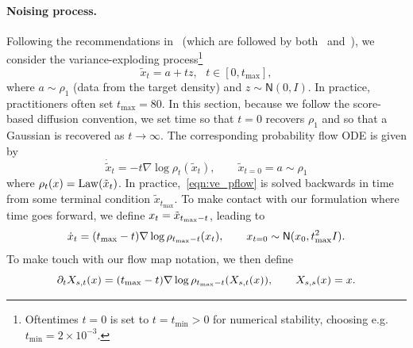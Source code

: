 \paragraph{Noising process.}
Following the recommendations in~\citet{karras_elucidating_2022} (which are followed by both~\citet{song_consistency_2023} and~\citet{song_improved_2023}), we consider the variance-exploding process\footnote{Oftentimes $t=0$ is set to $t=t_{\min}>0$ for numerical stability, choosing e.g. $t_{\min} = 2 \times 10^{-3}$. }
\begin{equation}
	\label{eqn:ve}
	\tilde x_t = a + t z, \:\:\: t \in [0, t_{\max}],
\end{equation}
where $a \sim \rho_1$ (data from the target density) and $z \sim \mathsf N(0, I)$.
%
In practice, practitioners often set $t_{\max} = 80$.
%
In this section, because we follow the score-based diffusion convention, we set time so that $t = 0$ recovers $\rho_1$ and so that a Gaussian is recovered as $t \to\infty$.
%
The corresponding probability flow ODE is given by
\begin{equation}
	\label{eqn:ve_pflow}
	\dot{\tilde x}_t = -t\nabla\log\rho_t(\tilde x_t), \qquad \tilde x_{t=0} = a \sim \rho_1
\end{equation}
where $\rho_t(x) = \operatorname{Law}(\tilde x_t)$.
%
In practice,~\eqref{eqn:ve_pflow} is solved backwards in time from some terminal condition $\tilde x_{t_{\max}}$.
%
To make contact with our formulation where time goes forward, we define ${x}_t = \tilde x_{t_{\max}-t}$, leading to
\begin{equation}
	\label{eqn:ve_fwd}
	\dot{x}_t = (t_{\max}-t)\nabla\log\rho_{t_{\max}-t}(x_t), \qquad x_{t=0} \sim \mathsf N(x_0,t_{\max}^2 I).
\end{equation}
To make touch with our flow map notation, we then define
\begin{equation}
	\label{eqn:ve_fwd_flow}
	\partial_t{X}_{s, t}(x) = (t_{\max} -t)\nabla\log\rho_{t_{\max} - t}(X_{s, t}(x)), \qquad X_{s,s}(x) = x.
\end{equation}


